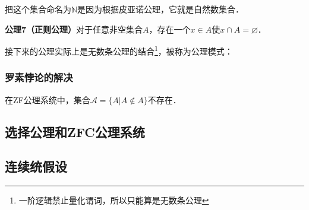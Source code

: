 把这个集合命名为$\mathbb{N}$是因为根据皮亚诺公理，它就是自然数集合．

\textbf{公理7（正则公理）}对于任意非空集合$A$，存在一个$x\in A$使$x\cap A=\varnothing$．

接下来的公理实际上是无数条公理的结合\footnote{一阶逻辑禁止量化谓词，所以只能算是无数条公理}，被称为公理模式：


\subsubsection{罗素悖论的解决}
\begin{theorem}{}
在ZF公理系统中，集合$\mathcal{A}=\{A|A\notin A\}$不存在．
\end{theorem}


\subsection{选择公理和ZFC公理系统}

\subsection{连续统假设}



